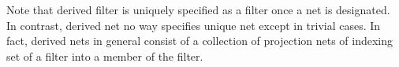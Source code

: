 \documentclass{report}
\begin{document}
\begin{rem}
    Note that derived filter is uniquely specified as a filter once a net is designated.
    In contrast, derived net no way specifies unique net except in trivial cases. In fact, derived nets in general consist of a collection of projection nets of indexing set of a filter into a member of the filter.
\end{rem}





\end{document}

